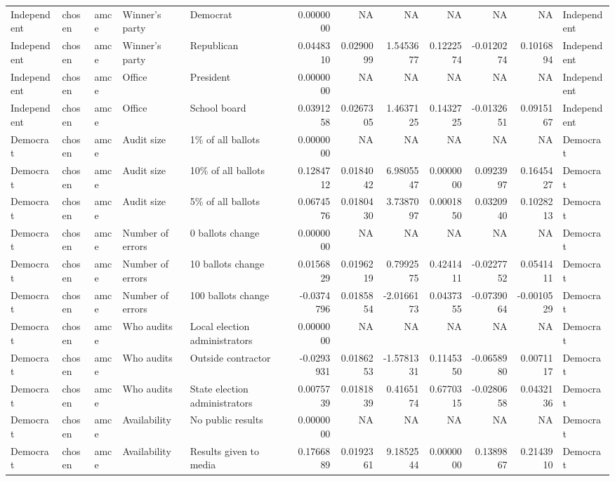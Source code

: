 \begin{table}
\begin{tabular}[t]{lllllrrrrrrl}
Independent & chosen & amce & Winner's party & Democrat & 0.0000000 & NA & NA & NA & NA & NA & Independent\\
Independent & chosen & amce & Winner's party & Republican & 0.0448310 & 0.0290099 & 1.5453677 & 0.1222574 & -0.0120274 & 0.1016894 & Independent\\
Independent & chosen & amce & Office & President & 0.0000000 & NA & NA & NA & NA & NA & Independent\\
\addlinespace
Independent & chosen & amce & Office & School board & 0.0391258 & 0.0267305 & 1.4637125 & 0.1432725 & -0.0132651 & 0.0915167 & Independent\\
Democrat & chosen & amce & Audit size & 1\% of all ballots & 0.0000000 & NA & NA & NA & NA & NA & Democrat\\
Democrat & chosen & amce & Audit size & 10\% of all ballots & 0.1284712 & 0.0184042 & 6.9805547 & 0.0000000 & 0.0923997 & 0.1645427 & Democrat\\
Democrat & chosen & amce & Audit size & 5\% of all ballots & 0.0674576 & 0.0180430 & 3.7387097 & 0.0001850 & 0.0320940 & 0.1028213 & Democrat\\
Democrat & chosen & amce & Number of errors & 0 ballots change & 0.0000000 & NA & NA & NA & NA & NA & Democrat\\
\addlinespace
Democrat & chosen & amce & Number of errors & 10 ballots change & 0.0156829 & 0.0196219 & 0.7992575 & 0.4241411 & -0.0227752 & 0.0541411 & Democrat\\
Democrat & chosen & amce & Number of errors & 100 ballots change & -0.0374796 & 0.0185854 & -2.0166173 & 0.0437355 & -0.0739064 & -0.0010529 & Democrat\\
Democrat & chosen & amce & Who audits & Local election administrators & 0.0000000 & NA & NA & NA & NA & NA & Democrat\\
Democrat & chosen & amce & Who audits & Outside contractor & -0.0293931 & 0.0186253 & -1.5781331 & 0.1145350 & -0.0658980 & 0.0071117 & Democrat\\
Democrat & chosen & amce & Who audits & State election administrators & 0.0075739 & 0.0181839 & 0.4165174 & 0.6770315 & -0.0280658 & 0.0432136 & Democrat\\
\addlinespace
Democrat & chosen & amce & Availability & No public results & 0.0000000 & NA & NA & NA & NA & NA & Democrat\\
Democrat & chosen & amce & Availability & Results given to media & 0.1766889 & 0.0192361 & 9.1852544 & 0.0000000 & 0.1389867 & 0.2143910 & Democrat\\

\end{tabular}
\end{table}
